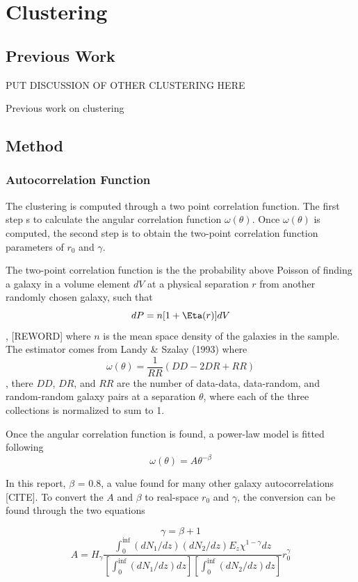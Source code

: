 \chapter{Clustering}

\section{Previous Work}

PUT DISCUSSION OF OTHER CLUSTERING HERE

Previous work on clustering

\section{Method}

\subsection{Autocorrelation Function}
The clustering is computed through a two point correlation function. The first step s to calculate the angular correlation function $ \omega(\theta)$. Once $ \omega(\theta)$ is computed, the second step is to obtain the two-point correlation function parameters of $r_0$ and $\gamma$.

The two-point correlation function is the the probability above Poisson of finding a galaxy in a volume element $dV$ at a physical separation $r$ from another randomly chosen galaxy, such that $$ dP = n[1 + \Eta(r)]dV$$, [REWORD] where $n$ is the mean space density of the galaxies in the sample. The estimator comes from Landy \& Szalay (1993) where $$ \omega(\theta) = \frac{1}{RR}(DD-2DR + RR)$$, there $DD$, $DR$, and $RR$ are the number of data-data, data-random, and random-random galaxy pairs at a separation $\theta$, where each of the three collections is normalized to sum to 1. 

Once the angular correlation function is found, a power-law model is fitted following $$\omega(\theta) = A\theta^{-\beta} $$

In this report, $\beta$ = 0.8, a value found for many other galaxy autocorrelations [CITE]. To convert the $A$ and $\beta$ to real-space $r_0$ and $\gamma$, the conversion can be found through the two equations

$$ \gamma = \beta + 1 $$ $$ A = H_{\gamma}\frac{\int_{0}^{\inf} (dN_1/dz)(dN_2/dz)E_z\chi^{1 - \gamma} dz}{[\int_{0}^{\inf} (dN_1/dz)dz][\int_{0}^{\inf} (dN_2/dz)dz]}r_0^{\gamma}$$

